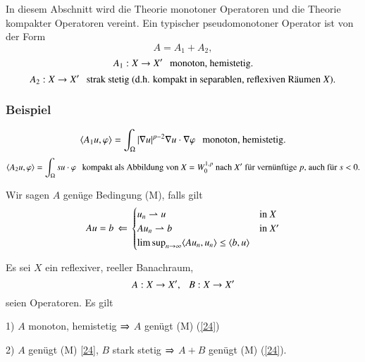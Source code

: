 In diesem Abschnitt wird die Theorie monotoner Operatoren und die Theorie kompakter Operatoren vereint.
Ein typischer pseudomonotoner Operator ist von der Form
\[
    A=A_1+A_2,
\] 
\[
    A_1: X\rightarrow X' \hspace{.25cm} \text{monoton, hemistetig.}
\]
\[
    A_2:X\rightarrow X' \hspace{.25cm} \text{strak stetig (d.h. kompakt in separablen, reflexiven Räumen $X$).}
\]

\subsubsection*{Beispiel}
\[
    \langle A_1u,\varphi\rangle = \int_\Omega |\nabla u|^{p-2} \nabla u \cdot \nabla \varphi\hspace{.25cm}
    \text{monoton, hemistetig.}
\]
\[
    \langle A_2u , \varphi \rangle =\int_\Omega su\cdot \varphi\hspace{.25cm}
    \text{kompakt als Abbildung von $X=W_0^{1,p}$ nach $X'$ für vernünftige $p$, auch für $s<0$.}
\]

\begin{defi} \label{4.13}
Wir sagen $A$ genüge Bedingung (M), falls gilt
\begin{align}\label{24}
    Au=b \, \Leftarrow \, \begin{cases}u_n\rightharpoonup u & \text{in } X\\
    Au_n\rightharpoonup b & \text{in }X'\\ \limsup_{n\rightarrow \infty} \langle Au_n,u_n\rangle \leq \langle b,u\rangle & 
    \end{cases}
\end{align}
\end{defi}

\begin{lem}\label{4.14}
    Es sei $X$ ein reflexiver, reeller Banachraum,
    \[
        A:X\rightarrow X', \hspace{.25cm} B: X\rightarrow X'
    \]
    seien Operatoren.
    Es gilt
    \begin{description}
        \item{1)}
        $A$ monoton, hemistetig $\Rightarrow$ $A$ genügt (M) (\ref{24})
        \item{2)}
        $A$ genügt (M) \ref{24}, $B$ stark stetig $\Rightarrow$ $A+B$ genügt (M) (\ref{24}).
    \end{description}
\end{lem}

